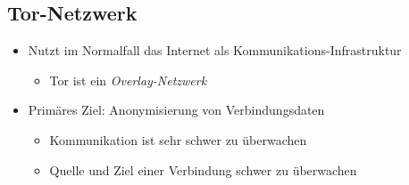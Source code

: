 \subsection{Tor-Netzwerk}
\begin{itemize}
    \item Nutzt im Normalfall das Internet als Kommunikations-Infrastruktur
    \begin{itemize}
        \item Tor ist ein \textit{Overlay-Netzwerk}
    \end{itemize}
    \item Primäres Ziel: Anonymisierung von Verbindungsdaten
    \begin{itemize}
        \item Kommunikation ist sehr schwer zu überwachen
        \item Quelle und Ziel einer Verbindung schwer zu überwachen
    \end{itemize}
\end{itemize}